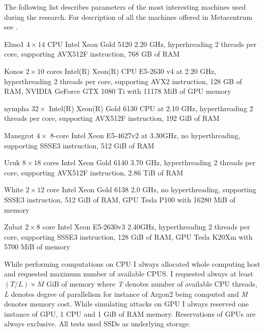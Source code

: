 \documentclass[nolof]{fithesis3}
\begin{document}
The following list describes parameters of the most interesting machines used during the research. For description of all the machines offered in Metacentrum see \parencite{metacentrumhw}.

\begin{description}
\item{Elmo1} $4\times14$ CPU Intel Xeon Gold 5120 2.20 GHz, hyperhreading 2 threads per core, supporting AVX512F instruction, 768 GB of RAM


\item{Konos} $2\times10$ cores Intel(R) Xeon(R) CPU E5-2630 v4 at 2.20 GHz, hyperthreading 2 threads per core, supporting AVX2 instruction, 128 GB of RAM, NVIDIA GeForce GTX 1080 Ti with 11178 MiB of GPU memory

\item{nympha} $32\times$ Intel(R) Xeon(R) Gold 6130 CPU at 2.10 GHz, hyperthreading 2 threads per core, supporting AVX512F instruction, 192 GiB of RAM

\item{Manegrot} $4\times$ 8-core Intel Xeon E5-4627v2 at 3.30GHz, no hyperthreading, supporting SSSE3 instruction, 512 GiB of RAM

\item{Uruk} $8\times18$ cores Intel Xeon Gold 6140  3.70 GHz, hyperthreading 2 threads per core, supporting AVX512F instruction, 2.86 TiB of RAM

\item{White} $2\times12$ core Intel Xeon Gold 6138 2.0 GHz, no hyperthreading, supporting SSSE3 instruction, 512 GiB of RAM, GPU Tesla P100 with 16280 MiB of memory

\item{Zubat} $2\times8$ core Intel Xeon E5-2630v3 2.40GHz, hyperthreading 2 threads per core, supporting SSSE3 instruction, 128 GiB of RAM, GPU Tesla K20Xm with 5700 MiB of memory
\end{description}

While performing computations on CPU I always allocated whole computing host and requested maximum number of available CPUS. I requested always at least $(T/L) \times M$ GiB of memory where \emph{T} denotes number of available CPU threads, \emph{L} denotes degree of parallelism for instance of Argon2 being computed and \emph{M} denotes memory cost. While simulating attacks on GPU I always reserved one instance of GPU, 1 CPU and 1 GiB of RAM memory. Reservations of GPUs are always exclusive. All tests used SSDs as underlying storage.
\end{document}

